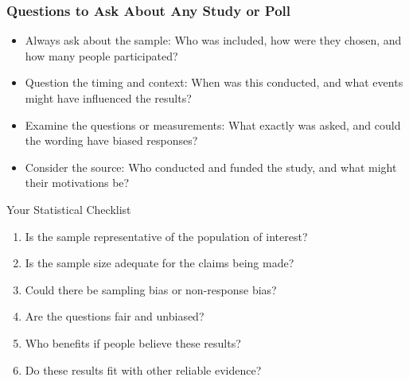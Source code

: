 \documentclass{beamer}
\begin{document}
				\begin{frame}
					\frametitle{Questions to Ask About Any Study or Poll}
					
					\begin{itemize}
						\item Always ask about the sample: Who was included, how were they chosen, and how many people participated?
						\item Question the timing and context: When was this conducted, and what events might have influenced the results?
						\item Examine the questions or measurements: What exactly was asked, and could the wording have biased responses?
						\item Consider the source: Who conducted and funded the study, and what might their motivations be?
					\end{itemize}
					
					\begin{alertblock}{Your Statistical Checklist}
						\begin{enumerate}
							\item Is the sample representative of the population of interest?
							\item Is the sample size adequate for the claims being made?
							\item Could there be sampling bias or non-response bias?
							\item Are the questions fair and unbiased?
							\item Who benefits if people believe these results?
							\item Do these results fit with other reliable evidence?
						\end{enumerate}
					\end{alertblock}
					
				\end{frame}
				
\end{document}

